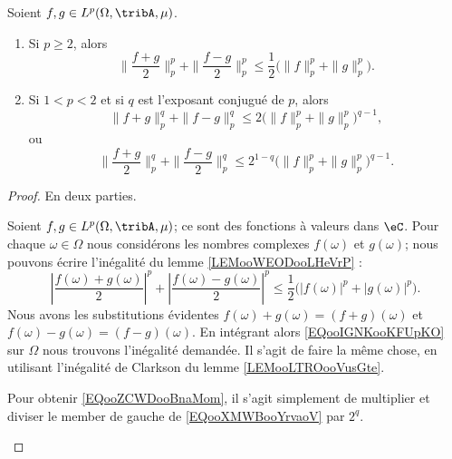 	\begin{proposition}      \label{PROPooJDOQooWsGlkr}
		Soient \( f,g\in L^p(\Omega,\tribA,\mu)\).
		\begin{enumerate}
			\item
			      Si \( p\geq 2\), alors
			      \begin{equation}        \label{EQooBWDJooGXzdxz}
				      \| \frac{ f+g }{2} \|_p^p+\| \frac{ f-g }{2} \|_p^p\leq \frac{ 1 }{2}\Big( \| f \|_p^p+\| g \|_p^p \Big).
			      \end{equation}
			\item
			      Si \( 1<p<2\) et si \( q\) est l'exposant conjugué de \( p\), alors
			      \begin{equation}        \label{EQooXMWBooYrvaoV}
				      \| f+g \|_p^q+\| f-g \|_p^q\leq 2\Big( \| f \|_p^p +\| g \|_p^p \Big)^{q-1},
			      \end{equation}
			      ou
			      \begin{equation}        \label{EQooZCWDooBnaMom}
				      \| \frac{ f+g }{2} \|_p^q+\| \frac{ f-g }{2} \|_p^q\leq 2^{1-q}\big( \| f \|_p^p+\| g \|_p^p \big)^{q-1}.
			      \end{equation}
		\end{enumerate}
	\end{proposition}

	\begin{proof}
		En deux parties.
		\begin{subproof}
			Soient \( f,g\in L^p(\Omega,\tribA,\mu)\); ce sont des fonctions à valeurs dans \( \eC\). Pour chaque \( \omega\in \Omega\) nous considérons les nombres complexes \( f(\omega)\) et \( g(\omega)\); nous pouvons écrire l'inégalité du lemme \ref{LEMooWEODooLHeVrP} :
			\begin{equation}        \label{EQooIGNKooKFUpKO}
				\left| \frac{ f(\omega)+g(\omega) }{2} \right|^p+\left| \frac{ f(\omega)-g(\omega) }{2} \right|^p\leq \frac{ 1 }{2}\big( | f(\omega) |^p+| g(\omega) |^p \big).
			\end{equation}
			Nous avons les substitutions évidentes \( f(\omega)+g(\omega)=(f+g)(\omega)\) et \( f(\omega)-g(\omega)=(f-g)(\omega)\). En intégrant alors \eqref{EQooIGNKooKFUpKO} sur \( \Omega\) nous trouvons l'inégalité demandée.
			\spitem[Pour \( 1<p<2\)]
			Il s'agit de faire la même chose, en utilisant l'inégalité de Clarkson du lemme \ref{LEMooLTROooVusGte}.

			Pour obtenir \eqref{EQooZCWDooBnaMom}, il s'agit simplement de multiplier et diviser le member de gauche de \eqref{EQooXMWBooYrvaoV} par \( 2^q\).
		\end{subproof}
	\end{proof}


